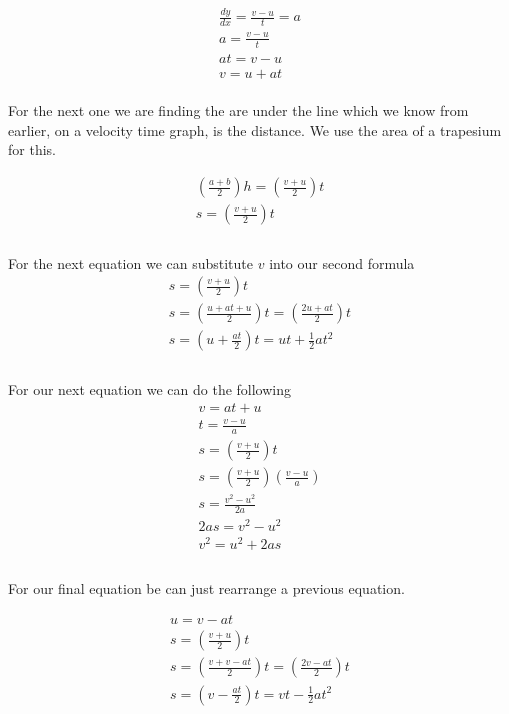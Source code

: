 \documentclass{article}
\begin{document}
\begin{gather}
	\frac{dy}{dx} = \frac{v - u}{t} = a \\
	a = \frac{v - u}{t} \\
	at = v - u \\
	v = u + at
\end{gather}
\\
For the next one we are finding the are under the line which we know
from earlier, on a velocity time graph, is the distance. We use the
area of a trapesium for this.

\begin{gather}
	\left ( \frac{a + b}{2} \right ) h = \left ( \frac{v + u}{2} \right )t \\
	s = \left ( \frac{v + u}{2} \right )t \\
\end{gather}
\\
For the next equation we can substitute $v$ into our second formula
\begin{gather}
	s = \left ( \frac{v + u}{2} \right )t \\
	s = \left ( \frac{u + at + u}{2} \right )t = \left ( \frac{2u + at}{2} \right )t \\
	s = \left ( u + \frac{at}{2} \right )t = ut + \frac{1}{2}at^2 \\
\end{gather}
\\
For our next equation we can do the following
\begin{gather}
	v = at + u \\
	t = \frac{v - u}{a} \\
	s = \left ( \frac{v + u}{2} \right )t \\
	s = \left ( \frac{v + u}{2} \right )\left (\frac{v - u}{a}\right ) \\
	s = \frac{v^2 - u^2}{2a} \\
	2as = v^2 - u^2 \\
	v^2 = u^2 + 2as \\
\end{gather}
\\
For our final equation be can just rearrange a previous equation.

\begin{gather}
	u = v - at \\
	s = \left ( \frac{v + u}{2} \right )t \\
	s = \left ( \frac{v + v - at}{2} \right )t = \left ( \frac{2v - at}{2} \right )t \\
	s = \left ( v - \frac{at}{2} \right )t = vt - \frac{1}{2}at^2 \\
\end{gather}
\end{document}
